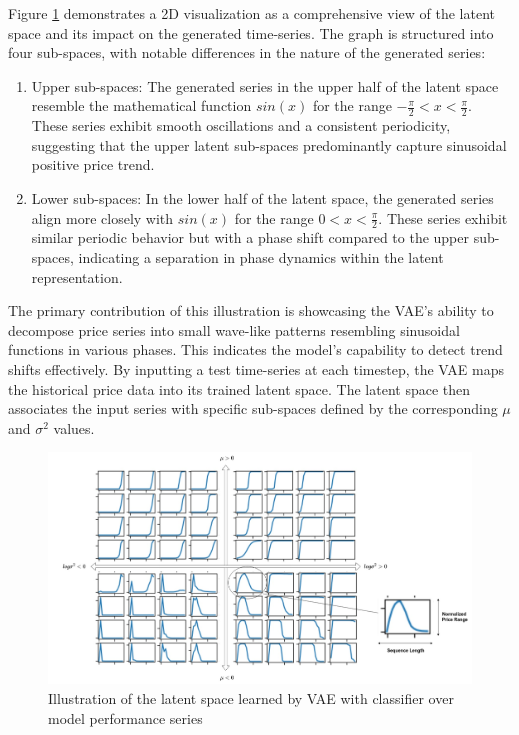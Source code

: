 Figure \ref{fig:latent_full} demonstrates a 2D visualization as a comprehensive view of the latent space and its impact on the generated time-series. The graph is structured into four sub-spaces, with notable differences in the nature of the generated series:

\begin{enumerate}
	\item Upper sub-spaces:
	The generated series in the upper half of the latent space resemble the mathematical function $sin(x)$ for the range $-\frac{\pi}{2} < x < \frac{\pi}{2}$. These series exhibit smooth oscillations and a consistent periodicity, suggesting that the upper latent sub-spaces predominantly capture sinusoidal positive price trend.
	
	\item Lower sub-spaces:
	In the lower half of the latent space, the generated series align more closely with $sin(x)$ for the range $0 < x < \frac{\pi}{2}$. These series exhibit similar periodic behavior but with a phase shift compared to the upper sub-spaces, indicating a separation in phase dynamics within the latent representation.
	
\end{enumerate}

The primary contribution of this illustration is showcasing the VAE's ability to decompose price series into small wave-like patterns resembling sinusoidal functions in various phases. This indicates the model's capability to detect trend shifts effectively. By inputting a test time-series at each timestep, the VAE maps the historical price data into its trained latent space. The latent space then associates the input series with specific sub-spaces defined by the corresponding $\mu$ and $\sigma^2$ values.

\begin{figure}[h]
	\centering
	\includegraphics[scale=0.25]{./LatentSpace.jpg}
	\caption{Illustration of the latent space learned by VAE with classifier over model performance series}
	\label{fig:latent_full}
\end{figure}


